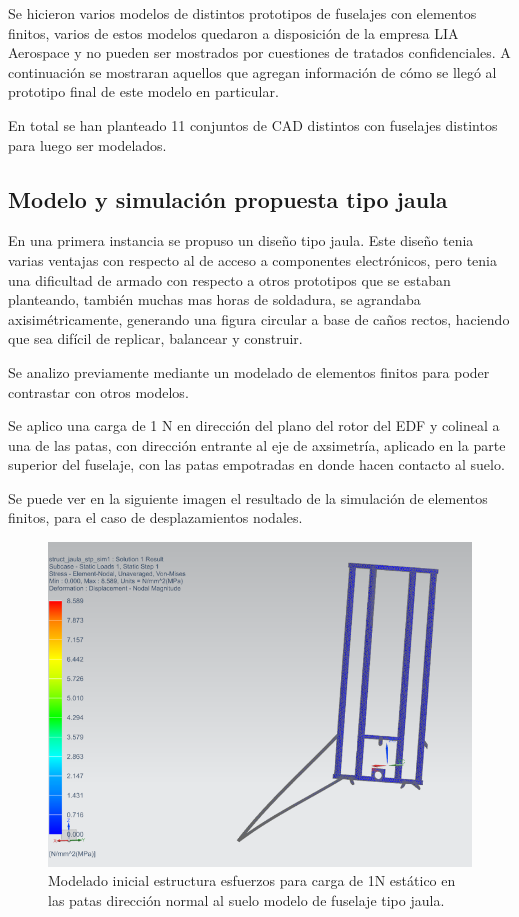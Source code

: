 Se hicieron varios modelos de distintos prototipos de fuselajes con elementos finitos, varios de estos modelos quedaron a disposición de la empresa LIA Aerospace y no pueden ser mostrados por cuestiones de tratados confidenciales. A continuación se mostraran aquellos que agregan información de cómo se llegó al prototipo final de este modelo en particular.

En total se han planteado 11 conjuntos de CAD distintos con fuselajes distintos para luego ser modelados.


\null\newpage
\clearpage

\subsection{Modelo y simulación propuesta tipo jaula}
En una primera instancia se propuso un diseño tipo jaula. Este diseño tenia varias ventajas con respecto al de acceso a componentes electrónicos, pero tenia una dificultad de armado con respecto a otros prototipos que se estaban planteando, también muchas mas horas de soldadura, se agrandaba axisimétricamente, generando una figura circular a base de caños rectos, haciendo que sea difícil de replicar, balancear y construir.

Se analizo previamente mediante un modelado de elementos finitos para poder contrastar con otros modelos.

Se aplico una carga de 1 N en dirección del plano del rotor del EDF y colineal a una de las patas, con dirección entrante al eje de axsimetría, aplicado en la parte superior del fuselaje, con las patas empotradas en donde hacen contacto al suelo.

Se puede ver en la siguiente imagen el resultado de la simulación de elementos finitos, para el caso de desplazamientos nodales.


\begin{figure}[htb]
    \centering
    \includegraphics[height=0.4\pdfpageheight]{fig/fea/jaula.png}
    \caption{Modelado inicial estructura esfuerzos para carga de 1N estático en las patas dirección normal al suelo modelo de fuselaje tipo jaula.}
    \label{fig:fea/jaula}
\end{figure}

